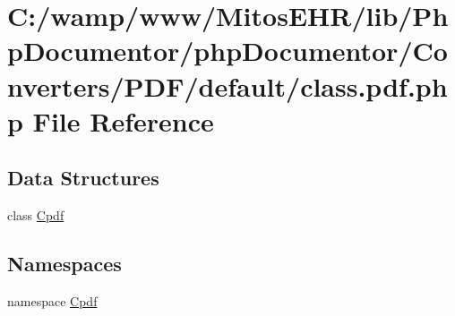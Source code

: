 \hypertarget{class_8pdf_8php}{\section{\-C\-:/wamp/www/\-Mitos\-E\-H\-R/lib/\-Php\-Documentor/php\-Documentor/\-Converters/\-P\-D\-F/default/class.pdf.\-php \-File \-Reference}
\label{class_8pdf_8php}
}
\subsection*{\-Data \-Structures}
\begin{DoxyCompactItemize}
\item 
class \hyperlink{class_cpdf}{\-Cpdf}
\end{DoxyCompactItemize}
\subsection*{\-Namespaces}
\begin{DoxyCompactItemize}
\item 
namespace \hyperlink{namespace_cpdf}{\-Cpdf}
\end{DoxyCompactItemize}
